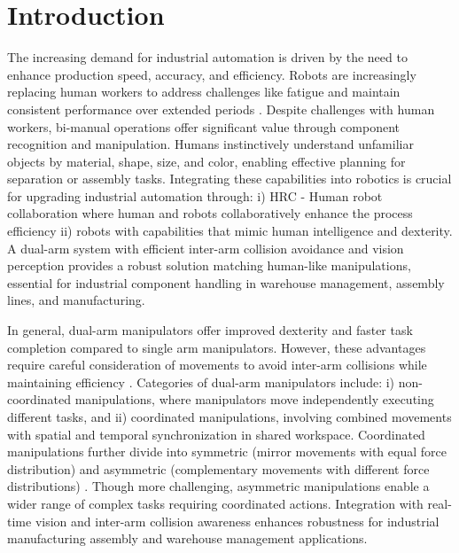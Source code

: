 \documentclass[utf8]{FrontiersinHarvard}
\begin{document}
\section{Introduction}
\label{sec1}
The increasing demand for industrial automation is driven by the need to enhance production speed, accuracy, and efficiency. Robots are increasingly replacing human workers to address challenges like fatigue and maintain consistent performance over extended periods \citet{LIU2022102360}. Despite challenges with human workers, bi-manual operations offer significant value through component recognition and manipulation. Humans instinctively understand unfamiliar objects by material, shape, size, and color, enabling effective planning for separation or assembly tasks. Integrating these capabilities into robotics is crucial for upgrading industrial automation through: i) HRC - Human robot collaboration where human and robots collaboratively enhance the process efficiency ii) robots with capabilities that mimic human intelligence and dexterity. A dual-arm system with efficient inter-arm collision avoidance and vision perception provides a robust solution matching human-like manipulations, essential for industrial component handling in warehouse management, assembly lines, and manufacturing.

In general, dual-arm manipulators offer improved dexterity and faster task completion compared to single arm manipulators. However, these advantages require careful consideration of movements to avoid inter-arm collisions while maintaining efficiency \citet{SMITH20121340}. Categories of dual-arm manipulators include: i) non-coordinated manipulations, where manipulators move independently executing different tasks, and ii) coordinated manipulations, involving combined movements with spatial and temporal synchronization in shared workspace. Coordinated manipulations further divide into symmetric (mirror movements with equal force distribution) and asymmetric (complementary movements with different force distributions) \citet{cooperative}. Though more challenging, asymmetric manipulations enable a wider range of complex tasks requiring coordinated actions. Integration with real-time vision and inter-arm collision awareness enhances robustness for industrial manufacturing assembly and warehouse management applications.
\end{document}
